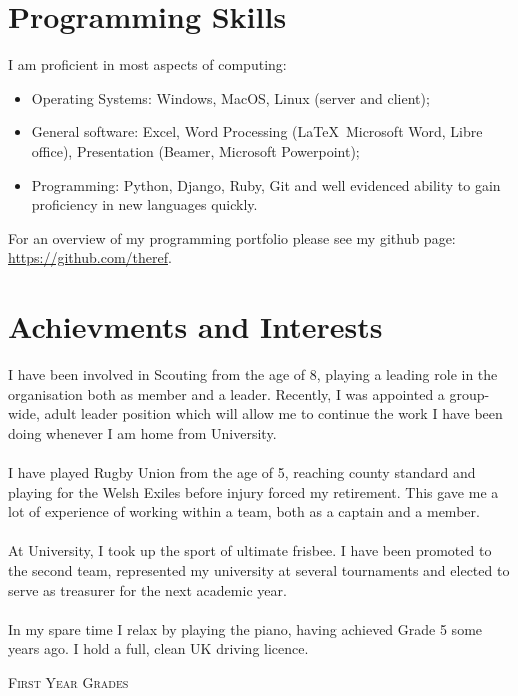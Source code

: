 \documentclass[a4paper]{article}
\begin{document}
\section{Programming Skills}
I am proficient in most aspects of computing:

\begin{itemize}
    \item Operating Systems: Windows, MacOS, Linux (server and client);
    \item General software: Excel, Word Processing (\LaTeX\, Microsoft Word, Libre office), Presentation (Beamer, Microsoft Powerpoint);
    \item Programming: Python, Django, Ruby, Git and well evidenced ability to gain proficiency in new languages quickly.
\end{itemize}

For an overview of my programming portfolio please see my github page: \url{https://github.com/theref}.
\section{Achievments and Interests}
I have been involved in Scouting from the age of 8, playing a leading role in the organisation both as member and a leader.
Recently, I was appointed a group-wide, adult leader position which will allow me to continue the work I have been doing whenever I am home from University. \\
\\
I have played Rugby Union from the age of 5, reaching county standard and playing for the Welsh Exiles before injury forced my retirement.
This gave me a lot of experience of working within a team, both as a captain and a member. \\
\\
At University, I took up the sport of ultimate frisbee. I have been promoted to the second team, represented my university at several tournaments and elected to serve as treasurer for the next academic year. \\
\\
In my spare time I relax by playing the piano, having achieved Grade 5 some years ago. I hold a full, clean UK driving licence.
\bigskip
\par{\centering\Large {\textsc{First Year Grades}}
\par}
\end{document}
